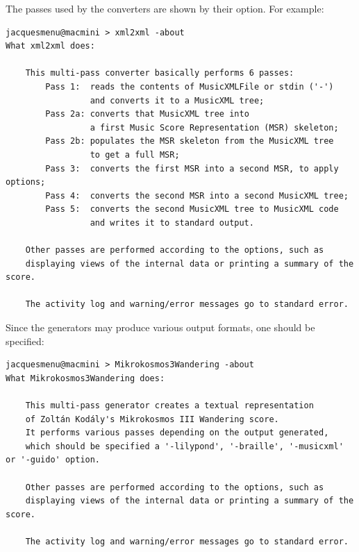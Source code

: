 The passes used by the converters are shown by their  option. For example:
\begin{lstlisting}[language=Terminal]
jacquesmenu@macmini > xml2xml -about
What xml2xml does:

    This multi-pass converter basically performs 6 passes:
        Pass 1:  reads the contents of MusicXMLFile or stdin ('-')
                 and converts it to a MusicXML tree;
        Pass 2a: converts that MusicXML tree into
                 a first Music Score Representation (MSR) skeleton;
        Pass 2b: populates the MSR skeleton from the MusicXML tree
                 to get a full MSR;
        Pass 3:  converts the first MSR into a second MSR, to apply options;
        Pass 4:  converts the second MSR into a second MusicXML tree;
        Pass 5:  converts the second MusicXML tree to MusicXML code
                 and writes it to standard output.

    Other passes are performed according to the options, such as
    displaying views of the internal data or printing a summary of the score.

    The activity log and warning/error messages go to standard error.
\end{lstlisting}

Since the generators may produce various output formats, one should be specified:
\begin{lstlisting}[language=Terminal]
jacquesmenu@macmini > Mikrokosmos3Wandering -about
What Mikrokosmos3Wandering does:

    This multi-pass generator creates a textual representation
    of Zoltán Kodály's Mikrokosmos III Wandering score.
    It performs various passes depending on the output generated,
    which should be specified a '-lilypond', '-braille', '-musicxml' or '-guido' option.

    Other passes are performed according to the options, such as
    displaying views of the internal data or printing a summary of the score.

    The activity log and warning/error messages go to standard error.
\end{lstlisting}

